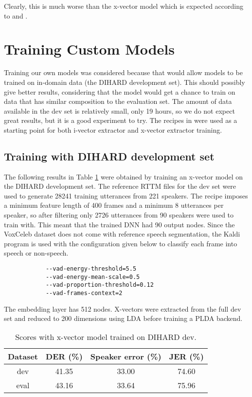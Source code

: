 		Clearly, this is much worse than the x-vector model which is expected according to \cite{snyder2018x} and \cite{sell2018diarization}.
	
	\section{Training Custom Models}
	Training our own models was considered because that would allow models to be trained on in-domain data (the DIHARD development set). This should possibly give better results, considering that the model would get a chance to train on data that has similar composition to the evaluation set. The amount of data available in the dev set is relatively small, only 19 hours, so we do not expect great results, but it is a good experiment to try. The recipes in  were used as a starting point for both i-vector extractor and x-vector extractor training.
	
		\subsection{Training with DIHARD development set}
			The following results in Table \ref{table-dev-xvec} were obtained by training an x-vector model on the DIHARD development set. The reference RTTM files for the dev set were used to generate 28241 training utterances from 221 speakers. The recipe imposes a minimum feature length of 400 frames and a minimum 8 utterances per speaker, so after filtering only 2726 utterances from 90 speakers were used to train with. This meant that the trained DNN had 90 output nodes. Since the VoxCeleb dataset does not come with reference speech segmentation, the Kaldi program  is used with the configuration given below to classify each frame into speech or non-speech.
			
			\begin{verbatim}
			--vad-energy-threshold=5.5
			--vad-energy-mean-scale=0.5
			--vad-proportion-threshold=0.12
			--vad-frames-context=2
			\end{verbatim}
			
			The embedding layer has 512 nodes. X-vectors were extracted from the full dev set and reduced to 200 dimensions using LDA before training a PLDA backend.
			
			\begin{table}[h]
				\centering
				\begin{tabular}{|c|c|c|c|}
					\hline
					Dataset & DER (\%) & Speaker error (\%) & JER (\%) \\
					\hline
					dev & 41.35 & 33.00 & 74.60 \\
					\hline
					eval & 43.16 & 33.64 & 75.96 \\
					\hline
				\end{tabular}
				\caption{Scores with x-vector model trained on DIHARD dev.}
				\label{table-dev-xvec}
			\end{table}
		
